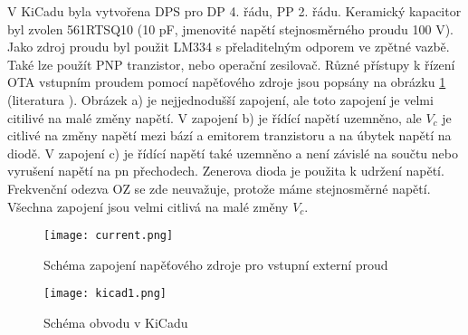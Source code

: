 \noindent V KiCadu byla vytvořena DPS pro DP 4. řádu, PP 2. řádu. Keramický kapacitor byl zvolen 561RTSQ10 (10 pF, jmenovité napětí stejnosměrného proudu 100 V). Jako zdroj proudu byl použit LM334 s přeladitelným odporem ve zpětné vazbě. Také lze použít PNP tranzistor, nebo operační zesilovač. Různé přístupy k řízení OTA vstupním proudem pomocí napěťového zdroje jsou popsány na obrázku \ref{s:DC} (literatura \cite{22}). Obrázek a) je nejjednodušší zapojení, ale toto zapojení je velmi citilivé na malé změny napětí. V zapojení b) je řídící napětí uzemněno, ale $V_c$ je citlivé na změny napětí mezi bází a emitorem tranzistoru a na úbytek napětí na diodě. V zapojení c) je řídící napětí také uzemněno a není závislé na součtu nebo vyrušení napětí na pn přechodech. Zenerova dioda je použita k udržení napětí. Frekvenční odezva OZ se zde neuvažuje, protože máme stejnosměrné napětí. Všechna zapojení jsou velmi citlivá na malé změny $V_c$.
\begin{figure}[h]
\centering
\texttt{[image: current.png]}
\caption{Schéma zapojení napěťového zdroje pro vstupní externí proud \label{s:DC} \cite{22}}
\end{figure}
\begin{figure}[h]
\centering
\texttt{[image: kicad1.png]}
\caption{Schéma obvodu v KiCadu}
\end{figure}